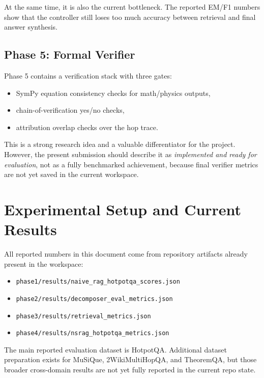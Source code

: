 \documentclass[11pt]{article}
\begin{document}
At the same time, it is also the current bottleneck. The reported EM/F1 numbers show that the controller still loses too much accuracy between retrieval and final answer synthesis.

\subsection{Phase 5: Formal Verifier}
Phase 5 contains a verification stack with three gates:

\begin{itemize}[leftmargin=1.2em]
\item SymPy equation consistency checks for math/physics outputs,
\item chain-of-verification yes/no checks,
\item attribution overlap checks over the hop trace.
\end{itemize}

This is a strong research idea and a valuable differentiator for the project. However, the present submission should describe it as \textit{implemented and ready for evaluation}, not as a fully benchmarked achievement, because final verifier metrics are not yet saved in the current workspace.

\section{Experimental Setup and Current Results}
All reported numbers in this document come from repository artifacts already present in the workspace:

\begin{itemize}[leftmargin=1.2em]
\item \texttt{phase1/results/naive\_rag\_hotpotqa\_scores.json}
\item \texttt{phase2/results/decomposer\_eval\_metrics.json}
\item \texttt{phase3/results/retrieval\_metrics.json}
\item \texttt{phase4/results/nsrag\_hotpotqa\_metrics.json}
\end{itemize}

The main reported evaluation dataset is HotpotQA. Additional dataset preparation exists for MuSiQue, 2WikiMultiHopQA, and TheoremQA, but those broader cross-domain results are not yet fully reported in the current repo state.
\end{document}
